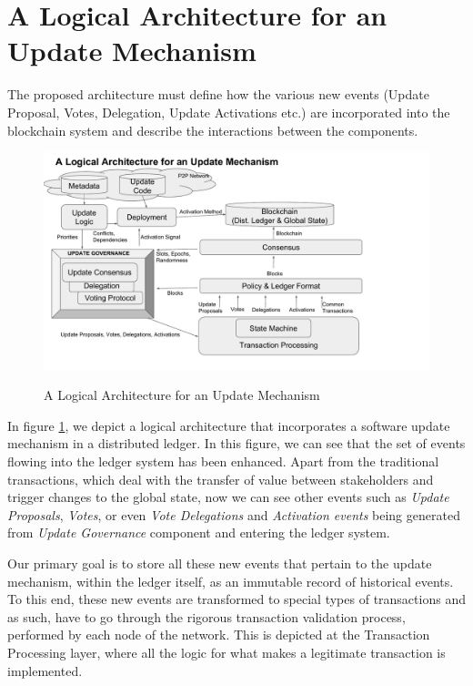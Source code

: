 \section{A Logical Architecture for an Update Mechanism}
The proposed architecture must define how the various new events (Update Proposal, Votes, Delegation, Update Activations etc.) are incorporated into the blockchain system and describe the interactions between the components.

\begin{figure}[H]
    \caption{A Logical Architecture for an Update Mechanism}
    \centering
    \includegraphics[width=0.9 \columnwidth,keepaspectratio]{figures/logical_architecture_v2.pdf}
    \label{logarch}
\end{figure}

In figure \ref{logarch}, we depict a logical architecture that incorporates a software update mechanism in a distributed ledger. In this figure, we can see that the set of events flowing into the ledger system has been enhanced. Apart from the traditional transactions, which deal with the transfer of value between stakeholders and trigger changes to the global state, now we can see other events such as \emph{Update Proposals}, \emph{Votes}, or even \emph{Vote Delegations} and \emph{Activation events} being generated from \emph{Update Governance} component and entering the ledger system.

Our primary goal is to store all these new events that pertain to the update mechanism, within the ledger itself, as an immutable record of historical events. To this end, these new events are transformed to special types of transactions and as such, have to go through the rigorous transaction validation process, performed by each node of the network. This is depicted at the Transaction Processing layer, where all the logic for what makes a legitimate transaction is implemented.

